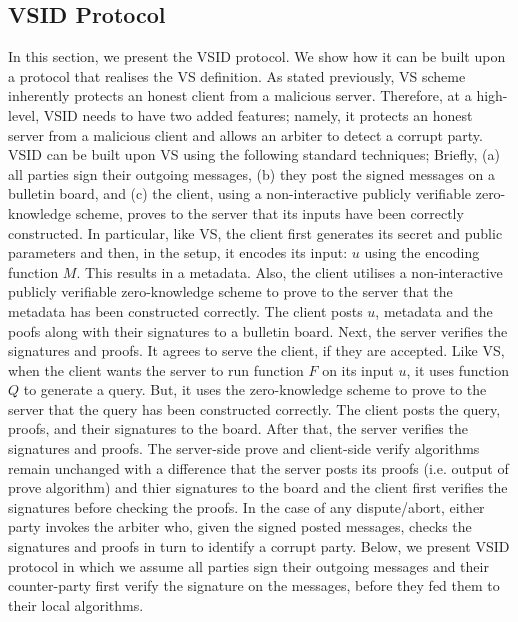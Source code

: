 

\subsection{VSID Protocol}


In this section, we present the VSID protocol. We show how it  can be built upon a protocol that realises the VS definition.  As stated previously, VS scheme inherently protects an honest client from a malicious server. Therefore, at a high-level, VSID needs to have two added features; namely, it protects an honest server from a malicious client and allows an arbiter to detect a corrupt party. VSID can be built upon VS using  the following standard techniques; Briefly, (a) all parties sign their outgoing messages, (b) they post the signed messages on a bulletin board, and (c) the client, using a non-interactive publicly verifiable zero-knowledge scheme, proves to the server that its inputs have been correctly constructed.   In particular, like VS, the client first generates its secret and public parameters and then, in the setup, it encodes its input: $u$ using the encoding function $M$. This results in a  metadata.  Also, the client   utilises a non-interactive publicly verifiable zero-knowledge scheme to prove to the server that the metadata has been constructed correctly.  The client posts $u$, metadata and the poofs along with their signatures to a bulletin board. Next, the server verifies the signatures and proofs. It  agrees to serve the client, if they are accepted.  Like VS, when the client wants the server to run  function $F$ on its input $u$, it uses  function $Q$ to generate a query. But, it uses the zero-knowledge scheme to prove to the server that the query has been constructed correctly. The client posts the query,  proofs, and their signatures to the board. After that, the server verifies the  signatures and proofs. The server-side prove  and client-side verify algorithms remain unchanged with a difference that the server posts its proofs (i.e. output of prove algorithm) and thier signatures to the board and the client first verifies the signatures before checking the proofs.  In the case of any dispute/abort, either party invokes the arbiter who, given the signed posted messages,  checks the signatures and proofs in turn to identify a corrupt party. Below, we present VSID protocol in which we assume all parties sign their outgoing messages and their counter-party first verify the signature on the messages, before they  fed them to their local algorithms. %

